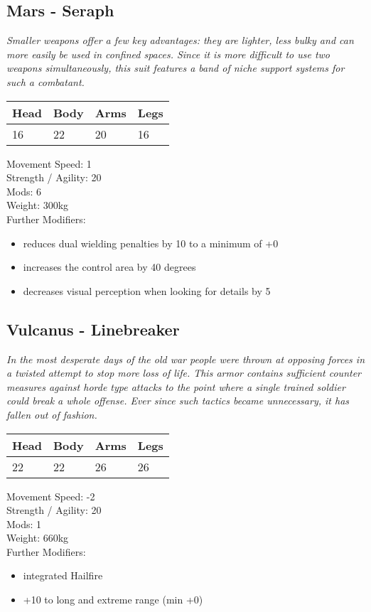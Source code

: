 \documentclass[12pt,a4paper,openany]{book}
\begin{document}
\begin{multicols}{2}
	\subsection{Mars - Seraph}
	\textit{Smaller weapons offer a few key advantages: they are lighter, less bulky and can more easily be used in confined spaces. Since it is more difficult to use two weapons simultaneously, this suit features a band of niche support systems for such a combatant.}\par
	\begin{tabular}{|l|l|l|l|}
		\hline
		Head & Body & Arms & Legs\\
		\hline
		16 & 22 & 20 & 16\\
		\hline
	\end{tabular}
	\par
	Movement Speed: 1\\
	Strength / Agility: 20\\
	Mods: 6\\
	Weight: 300kg\\
	Further Modifiers:
	\vspace{-8mm}
	\begin{itemize}
		\setlength\itemsep{-8mm}
		\item reduces dual wielding penalties by 10 to a minimum of +0
		\item increases the control area by 40 degrees
		\item decreases visual perception when looking for details by 5
	\end{itemize}
	\par
	\subsection{Vulcanus - Linebreaker}
	\textit{In the most desperate days of the old war people were thrown at opposing forces in a twisted attempt to stop more loss of life. This armor contains sufficient counter measures against horde type attacks to the point where a single trained soldier could break a whole offense. Ever since such tactics became unnecessary, it has fallen out of fashion.}\par
	\begin{tabular}{|l|l|l|l|}
		\hline
		Head & Body & Arms & Legs\\
		\hline
		22 & 22 & 26 & 26\\
		\hline
	\end{tabular}
	\par
	Movement Speed: -2\\
	Strength / Agility: 20\\
	Mods: 1\\
	Weight: 660kg\\
	Further Modifiers:
	\vspace{-8mm}
	\begin{itemize}
		\setlength\itemsep{-8mm}
		\item integrated Hailfire
		\item +10 to long and extreme range (min +0)
	\end{itemize}
	\par

\end{multicols}
\end{document}
